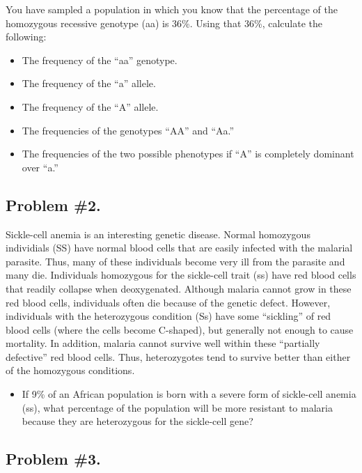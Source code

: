 \documentclass[
  a4paper]{book}
\providecommand{\tightlist}{%
  \setlength{\itemsep}{0pt}\setlength{\parskip}{0pt}}
\begin{document}
You have sampled a population in which you know that the percentage of the homozygous recessive genotype (aa) is 36\%. Using that 36\%, calculate the following:

\begin{itemize}
\tightlist
\item
  The frequency of the ``aa'' genotype.
\item
  The frequency of the ``a'' allele.
\item
  The frequency of the ``A'' allele.
\item
  The frequencies of the genotypes ``AA'' and ``Aa.''
\item
  The frequencies of the two possible phenotypes if ``A'' is completely dominant over ``a.''
\end{itemize}

\subsection{Problem \#2.}\label{problem-2.}

Sickle-cell anemia is an interesting genetic disease. Normal homozygous individials (SS) have normal blood cells that are easily infected with the malarial parasite. Thus, many of these individuals become very ill from the parasite and many die. Individuals homozygous for the sickle-cell trait (ss) have red blood cells that readily collapse when deoxygenated. Although malaria cannot grow in these red blood cells, individuals often die because of the genetic defect. However, individuals with the heterozygous condition (Ss) have some ``sickling'' of red blood cells (where the cells become C-shaped), but generally not enough to cause mortality. In addition, malaria cannot survive well within these ``partially defective'' red blood cells. Thus, heterozygotes tend to survive better than either of the homozygous conditions.

\begin{itemize}
\tightlist
\item
  If 9\% of an African population is born with a severe form of sickle-cell anemia (ss), what percentage of the population will be more resistant to malaria because they are heterozygous for the sickle-cell gene?
\end{itemize}

\subsection{Problem \#3.}\label{problem-3.}
\end{document}
